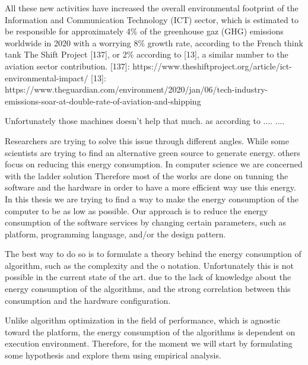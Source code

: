 All these new activities have increased the overall environmental footprint of the Information and Communication Technology (ICT) sector, which is estimated to be responsible for approximately 4\% of the greenhouse gaz (GHG) emissions worldwide in 2020 with a worrying 8\% growth rate, according to the French think tank The Shift Project [137], or 2\% according to [13], a similar number to the aviation sector contribution.
    [137]: https://www.theshiftproject.org/article/ict-environmental-impact/
[13]: https://www.theguardian.com/environment/2020/jan/06/tech-industry-emissions-soar-at-double-rate-of-aviation-and-shipping



Unfortunately those machines doesn't help that much. as according to .... ....


Researchers are trying to solve this issue through different angles.
While some scientists are trying to find an alternative green source to generate energy. others focus on reducing this energy consumption.
In computer science we are concerned with the ladder solution %
Therefore most of the works are done on tunning the software and the hardware in order to have a more efficient way use this energy. %
In this thesis we are trying to find a way to make the energy consumption of the computer to be as low as possible. %
Our approach is to reduce the energy consumption of the software services by changing certain parameters, such as platform, programming language, and/or the design pattern.

The best way to do so is to formulate a theory behind the energy consumption of algorithm, such as the complexity and the o notation.
Unfortunately this is not possible in the current state of the art. due to the lack of knowledge about the energy consumption of the algorithms, and the strong correlation between this consumption and the hardware configuration.

Unlike algorithm optimization in the field of performance, which is agnostic toward the platform, the energy consumption of the algorithms is dependent on execution environment.
Therefore, for the moment we will start by formulating some hypothesis and explore them using empirical analysis.

